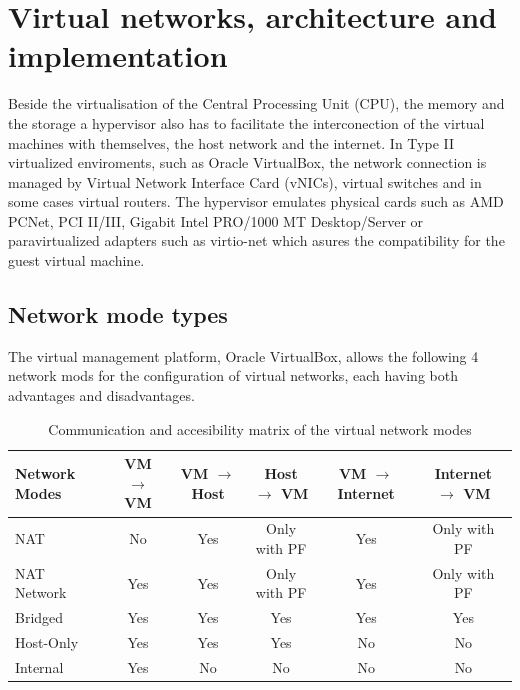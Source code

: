 \section{Virtual networks, architecture and implementation}
Beside the virtualisation of the Central Processing Unit (CPU), the memory and the storage a hypervisor also has to facilitate the interconection of the virtual machines with themselves, the host network and the internet. In Type II virtualized enviroments, such as Oracle VirtualBox, the network connection is managed by Virtual Network Interface Card (vNICs), virtual switches and in some cases virtual routers. \cite{implementation-of-internetworking-with-host-internet-in-oracle-virtualbox-guest-virtual-machines.pdf} The hypervisor emulates physical cards such as AMD PCNet, PCI II/III, Gigabit Intel PRO/1000 MT Desktop/Server or paravirtualized adapters such as virtio-net which asures the compatibility for the guest virtual machine.

\subsection{Network mode types}
The virtual management platform, Oracle VirtualBox, allows the following 4 network mods for the configuration of virtual networks, each having both advantages and disadvantages.

\begin{table}[htbp]
    \centering
    \caption{Communication and accesibility matrix of the virtual network modes \cite{implementation-of-internetworking-with-host-internet-in-oracle-virtualbox-guest-virtual-machines.pdf}}
    \begin{tabular}{l c c c c c}
        \toprule
        \textbf{Network Modes} & \textbf{VM $\rightarrow$ VM} & \textbf{VM $\rightarrow$ Host} & \textbf{Host $\rightarrow$ VM} & \textbf{VM $\rightarrow$ Internet} & \textbf{Internet $\rightarrow$ VM} \\
        \midrule

        NAT & No & Yes & Only with PF & Yes & Only with PF\\
        NAT Network & Yes & Yes & Only with PF & Yes & Only with PF \\
        Bridged & Yes & Yes & Yes & Yes & Yes \\
        Host-Only & Yes & Yes & Yes & No & No \\
        Internal & Yes & No & No & No & No \\
        \bottomrule
    \end{tabular}
\end{table}

